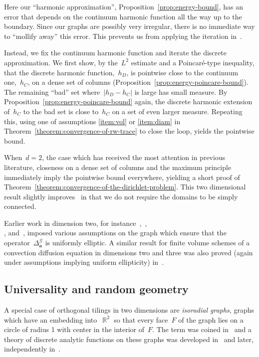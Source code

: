 \documentclass[12pt]{amsart}
\numberwithin{equation}{section}
\DeclareMathOperator{\R}{\mathbb{R}}
\newcommand{\aDelta}{\hyperref[eq:geometric-laplacian]{{\Delta^{\mathcal{G}}_{\cond}}}}
\newcommand{\cond}{\hyperref[eq:geometric-laplacian]{\mathbf{a}}}
\begin{document}
Here our ``harmonic approximation'', Proposition~\ref{prop:energy-bound}, has an error 
that depends on the continuum harmonic function all the way up to the boundary. Since our graphs are possibly very irregular, there is no immediate way to ``mollify away'' this error. This prevents us from applying the iteration in~\cite{armstrongsmart}. 

Instead, we fix the continuum harmonic function and iterate the discrete approximation. We first show, by the~$L^2$ estimate and a Poincar\'e-type inequality, that the discrete harmonic function,~$h_D$, is pointwise close to the continuum one,~$h_C$, on a dense set of columns (Proposition~\ref{prop:energy-poincare-bound}). The remaining ``bad'' set where~$|h_D - h_C|$ is large has small measure. By Proposition~\ref{prop:energy-poincare-bound} again, the discrete harmonic extension of~$h_C$ to the bad set is close to~$h_C$ on a set of even larger measure. Repeating this, using one of assumptions \ref{item:vol} or \ref{item:diam} in Theorem~\ref{theorem:convergence-of-rw-trace} to close the loop, yields the pointwise bound. 

When~$d=2$, the case which has received the most attention in previous literature, closeness on a dense set of columns and the maximum principle immediately imply the pointwise bound everywhere, yielding a short proof of Theorem~\ref{theorem:convergence-of-the-dirichlet-problem}. This two dimensional result slightly improves~\cite[Theorem 1.1]{gurel2020dirichlet} in that we do not require the domains to be simply connected. 


Earlier work in dimension two, for instance~\cite{MR1692623},~\cite{chelkaksmirnov}, \\ \cite{skopenkov2013boundary}, and~\cite{werness2015discrete}, imposed various assumptions on the graph which ensure that the operator~$\aDelta$ is uniformly elliptic. A similar result for finite volume schemes of a convection diffusion equation in dimensions two and three was also proved (again under assumptions implying uniform ellipticity) in~\cite[Corollary 1]{MR1863279}.



\subsection{Universality and random geometry} 
\label{subsec:universality}
A special case of orthogonal tilings in two dimensions are \emph{isoradial graphs}, graphs which have an embedding into~$\R^2$ so that every face~$F$ of the graph lies on a circle of radius 1 with center in the interior of~$F$.  The term was coined in~\cite{kenyon2002} and a theory of discrete analytic functions on these graphs was developed in~\cite{duffin} and later, independently in~\cite{mercat}. 
\end{document}
